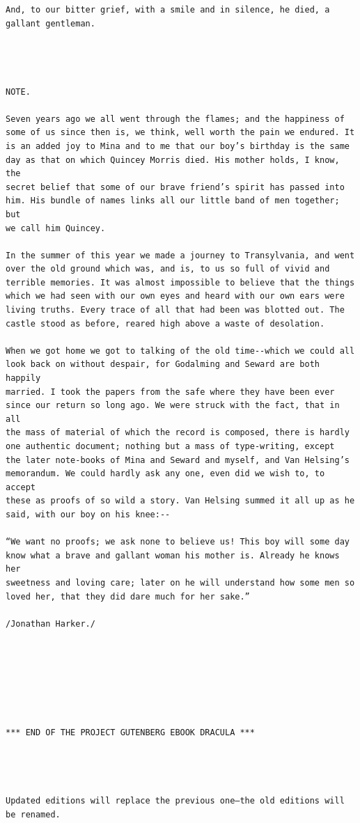 \documentclass{article}
\begin{document}
\begin{verbatim}
And, to our bitter grief, with a smile and in silence, he died, a
gallant gentleman.




NOTE.

Seven years ago we all went through the flames; and the happiness of
some of us since then is, we think, well worth the pain we endured. It
is an added joy to Mina and to me that our boy’s birthday is the same
day as that on which Quincey Morris died. His mother holds, I know, the
secret belief that some of our brave friend’s spirit has passed into
him. His bundle of names links all our little band of men together; but
we call him Quincey.

In the summer of this year we made a journey to Transylvania, and went
over the old ground which was, and is, to us so full of vivid and
terrible memories. It was almost impossible to believe that the things
which we had seen with our own eyes and heard with our own ears were
living truths. Every trace of all that had been was blotted out. The
castle stood as before, reared high above a waste of desolation.

When we got home we got to talking of the old time--which we could all
look back on without despair, for Godalming and Seward are both happily
married. I took the papers from the safe where they have been ever
since our return so long ago. We were struck with the fact, that in all
the mass of material of which the record is composed, there is hardly
one authentic document; nothing but a mass of type-writing, except
the later note-books of Mina and Seward and myself, and Van Helsing’s
memorandum. We could hardly ask any one, even did we wish to, to accept
these as proofs of so wild a story. Van Helsing summed it all up as he
said, with our boy on his knee:--

“We want no proofs; we ask none to believe us! This boy will some day
know what a brave and gallant woman his mother is. Already he knows her
sweetness and loving care; later on he will understand how some men so
loved her, that they did dare much for her sake.”

/Jonathan Harker./







*** END OF THE PROJECT GUTENBERG EBOOK DRACULA ***




Updated editions will replace the previous one—the old editions will
be renamed.


\end{verbatim}
\end{document}
